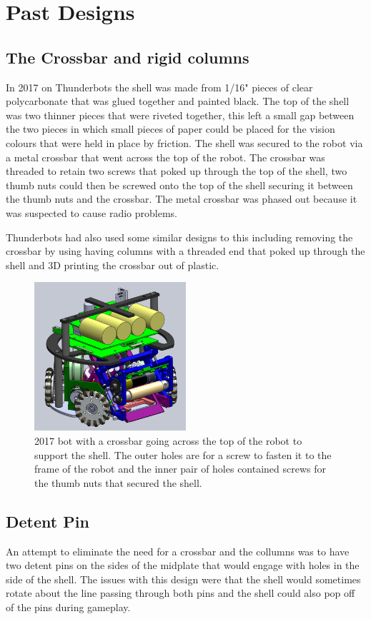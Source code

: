 \documentclass{iopart}
\begin{document}
\section{Past Designs}
\subsection{The Crossbar and rigid columns}
In 2017 on Thunderbots the shell was made from 1/16" pieces of clear polycarbonate that was glued together and painted black. The top of the shell was two thinner pieces that were riveted together, this left a small gap between the two pieces in which small pieces of paper could be placed for the vision colours that were held in place by friction. The shell was secured to the robot via a metal crossbar that went across the top of the robot. The crossbar was threaded to retain two screws that poked up through the top of the shell, two thumb nuts could then be screwed onto the top of the shell securing it between the thumb nuts and the crossbar. The metal crossbar was phased out because it was suspected to cause radio problems. 

Thunderbots had also used some similar designs to this including removing the crossbar by using having columns with a threaded end that poked up through the shell and 3D printing the crossbar out of plastic. 

\begin{figure}[h!]
    \centering
    \includegraphics[width=0.5\textwidth]{graphics/crossbar.png}\\
    2017 bot with a crossbar going across the top of the robot to support the shell. The outer holes are for a screw to fasten it to the frame of the robot and the inner pair of holes contained screws for the thumb nuts that secured the shell.
\end{figure}

\subsection{Detent Pin}
An attempt to eliminate the need for a crossbar and the collumns was to have two detent pins on the sides of the midplate that would engage with holes in the side of the shell. The issues with this design were that the shell would sometimes rotate about the line passing through both pins and the shell could also pop off of the pins during gameplay.
\end{document}
